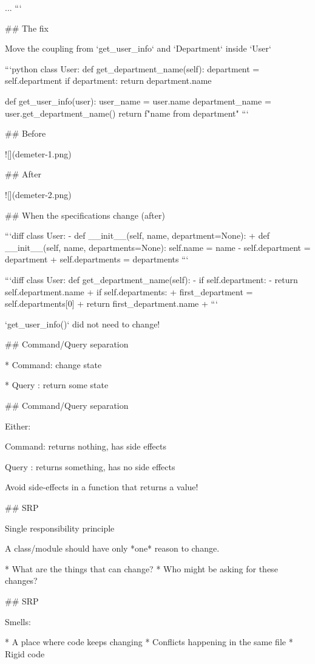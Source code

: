     ...
```


## The fix

Move the coupling from `get_user_info` and `Department` inside `User`

```python
class User:
    def get_department_name(self):
        department = self.department
        if department:
            return department.name

def get_user_info(user):
    user_name = user.name
    department_name = user.get_department_name()
    return f"{name} from {department}"
```

## Before

![](demeter-1.png)

## After

![](demeter-2.png)

## When the specifications change (after)


```diff
class User:
- def __init__(self, name, department=None):
+ def __init__(self, name, departments=None):
        self.name = name
-        self.department = department
+        self.departments = departments
```

```diff
class User:
   def get_department_name(self):
-       if self.department:
-           return self.department.name
+       if self.departments:
+           first_department = self.departments[0]
+           return first_department.name
+
```

`get_user_info()` did not need to change!

## Command/Query separation

* Command: change state

* Query : return some state

## Command/Query separation

Either:

Command: returns nothing, has side effects

Query : returns something, has no side effects

Avoid side-effects in a function that returns a value!

## SRP

Single responsibility principle

A class/module should have only *one* reason to change.

* What are the things that can change?
* Who might be asking for these changes?

## SRP

Smells:

* A place where code keeps changing
* Conflicts happening in the same file
* Rigid code

